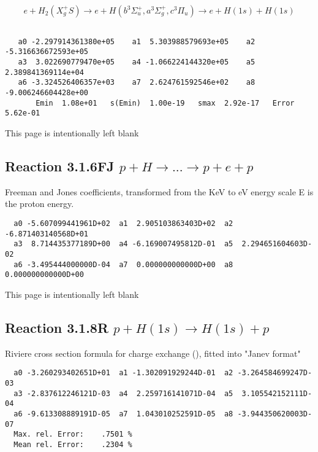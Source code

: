 \documentclass[12pt]{article}
\begin{document}
\begin{displaymath}
 e + H_2 (X_g^+ S ) \rightarrow e + H (b^3\Sigma^+_u , a^3\Sigma^+_g,
c^3\Pi_u)
             \rightarrow e + H(1s) + H(1s)
\end{displaymath}


\begin{small}\begin{verbatim}

   a0 -2.297914361380e+05    a1  5.303988579693e+05    a2 -5.316636672593e+05
   a3  3.022690779470e+05    a4 -1.066224144320e+05    a5  2.389841369114e+04
   a6 -3.324526406357e+03    a7  2.624761592546e+02    a8 -9.006246604428e+00
       Emin  1.08e+01   s(Emin)  1.00e-19   smax  2.92e-17   Error  5.62e-01
\end{verbatim}\end{small}
\newpage
This page is intentionally left blank
\newpage


\subsection{
Reaction 3.1.6FJ
$ p + H \rightarrow . . . \rightarrow p + e + p $ }

Freeman and Jones coefficients, transformed from the KeV to eV energy scale
E is the proton energy.

\begin{small}\begin{verbatim}
  a0 -5.607099441961D+02  a1  2.905103863403D+02  a2 -6.871403140568D+01
  a3  8.714435377189D+00  a4 -6.169007495812D-01  a5  2.294651604603D-02
  a6 -3.495444000000D-04  a7  0.000000000000D+00  a8  0.000000000000D+00

\end{verbatim}\end{small}
\newpage
This page is intentionally left blank
\newpage

\subsection{
Reaction 3.1.8R $  p + H(1s) \rightarrow H(1s) + p  $
}
Riviere cross section formula for charge exchange
(\cite{kn:Riviere}), fitted into
"Janev format"

\begin{small}\begin{verbatim}
  a0 -3.260293402651D+01  a1 -1.302091929244D-01  a2 -3.264584699247D-03
  a3 -2.837612246121D-03  a4  2.259716141071D-04  a5  3.105542152111D-04
  a6 -9.613308889191D-05  a7  1.043010252591D-05  a8 -3.944350620003D-07
  Max. rel. Error:    .7501 %
  Mean rel. Error:    .2304 %
\end{verbatim}\end{small}
\end{document}

